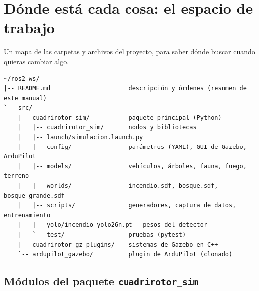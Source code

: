 \chapter{Dónde está cada cosa: el espacio de trabajo}

\begin{enpocas}
Un mapa de las carpetas y archivos del proyecto, para saber dónde buscar cuando quieras cambiar algo.
\end{enpocas}

\begin{lstlisting}
~/ros2_ws/
|-- README.md                      descripción y órdenes (resumen de este manual)
`-- src/
    |-- cuadrirotor_sim/           paquete principal (Python)
    |   |-- cuadrirotor_sim/       nodos y bibliotecas
    |   |-- launch/simulacion.launch.py
    |   |-- config/                parámetros (YAML), GUI de Gazebo, ArduPilot
    |   |-- models/                vehículos, árboles, fauna, fuego, terreno
    |   |-- worlds/                incendio.sdf, bosque.sdf, bosque_grande.sdf
    |   |-- scripts/               generadores, captura de datos, entrenamiento
    |   |-- yolo/incendio_yolo26n.pt   pesos del detector
    |   `-- test/                  pruebas (pytest)
    |-- cuadrirotor_gz_plugins/    sistemas de Gazebo en C++
    `-- ardupilot_gazebo/          plugin de ArduPilot (clonado)
\end{lstlisting}

\section{Módulos del paquete \texorpdfstring{\texttt{cuadrirotor\_sim}}{cuadrirotor\_sim}}

